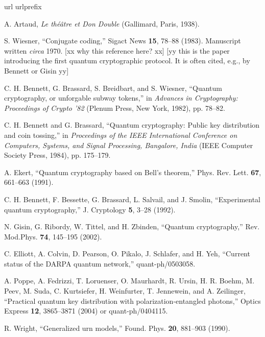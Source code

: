 \documentclass[prb,amssymb,preprint]{revtex4}
\begin{document}
\begin{thebibliography}{10}
\newcommand{\enquote}[1]{``#1''}
\expandafter\ifx\csname url\endcsname\relax
\def\url#1{\texttt{#1}}\fi
\expandafter\ifx\csname urlprefix\endcsname\relax\def\urlprefix{URL }\fi
\providecommand{\eprint}[2][]{\url{#2}}

A. Artaud, \emph{Le th{\'{e}}{\^{a}}tre et Don Double} (Gallimard, Paris,
1938).

 S. Wiesner, ``Conjugate coding,'' Sigact News
\textbf{15}, 78--88 (1983).
Manuscript written {\it circa} 1970.\cite{benn-92}
[xx why this reference here? xx]
[yy this is the paper introducing the first quantum cryptographic protocol.
It is often cited, e.g., by Bennett or  Gisin yy]

 C. H. Bennett, G. Brassard, S. Breidbart, and S. Wiesner,
``Quantum
cryptography, or unforgable subway tokens,'' in \emph{Advances in
Cryptography: Proceedings of Crypto '82} (Plenum Press, New York,
1982), pp. 78--82.

C. H. Bennett and G. Brassard, ``Quantum cryptography: Public key
distribution and coin tossing,'' in \emph{Proceedings of the IEEE
International Conference on Computers, Systems, and Signal Processing,
Bangalore, India} (IEEE Computer Society Press, 1984), pp. 175--179.

A. Ekert, ``Quantum cryptography based on Bell's theorem,'' Phys.
Rev. Lett. \textbf{67}, 661--663 (1991).

C. H. Bennett, F. Bessette, G. Brassard, L. Salvail, and J. Smolin,
``Experimental quantum cryptography,'' J. Cryptology
\textbf{5}, 3--28 (1992).

N. Gisin, G. Ribordy, W. Tittel, and H. Zbinden, ``Quantum
cryptography,'' Rev. Mod.Phys. \textbf{74}, 145--195 (2002).

C. Elliott, A. Colvin, D. Pearson, O. Pikalo, J. Schlafer, and H. Yeh,
``Current status of the DARPA quantum network,''
quant-ph/0503058.

A. Poppe, A. Fedrizzi, T. Loruenser, O. Maurhardt, R. Ursin, H. R. Boehm,
M. Peev, M. Suda, C. Kurtsiefer, H. Weinfurter, T. Jennewein, and
A. Zeilinger, ``Practical quantum key distribution with
polarization-entangled photons,'' Optics Express \textbf{12}, 3865--3871
(2004) or quant-ph/0404115.

R. Wright, ``Generalized urn models,'' Found. Phys.
\textbf{20}, 881--903 (1990).


\end{thebibliography}
\end{document}
